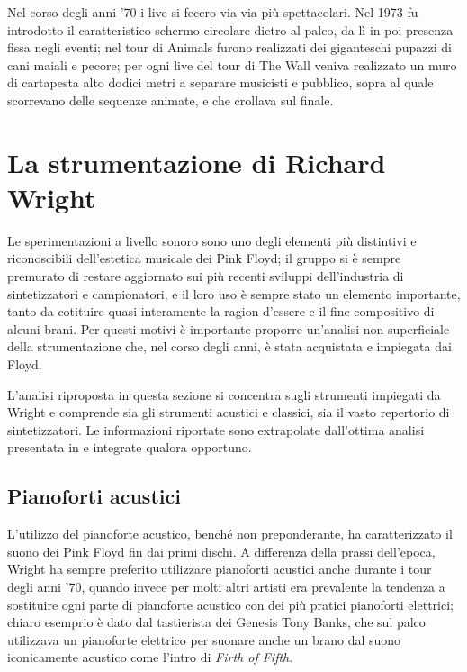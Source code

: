 \documentclass[class=book, crop=false, oneside, 12pt]{standalone}
\begin{document}
    Nel corso degli anni '70 i live si fecero via via più spettacolari. Nel 1973 fu introdotto il caratteristico schermo circolare dietro al palco, da lì in poi presenza fissa negli eventi; nel tour di Animals furono realizzati dei giganteschi pupazzi di cani maiali e pecore; per ogni live del tour di The Wall veniva realizzato un muro di cartapesta alto dodici metri a separare musicisti e pubblico, sopra al quale scorrevano delle sequenze animate, e che crollava sul finale.



    \section{La strumentazione di Richard Wright}\label{sec:01-gear}
    Le sperimentazioni a livello sonoro sono uno degli elementi più distintivi e riconoscibili dell'estetica musicale dei Pink Floyd; il gruppo si è sempre premurato di restare aggiornato sui più recenti sviluppi dell'industria di sintetizzatori e campionatori, e il loro uso è sempre stato un elemento importante, tanto da cotituire quasi interamente la ragion d'essere e il fine compositivo di alcuni brani. Per questi motivi è importante proporre un'analisi non superficiale della strumentazione che, nel corso degli anni, è stata acquistata e impiegata dai Floyd.

    L'analisi riproposta in questa sezione si concentra sugli strumenti impiegati da Wright e comprende sia gli strumenti acustici e classici, sia il vasto repertorio di sintetizzatori. Le informazioni riportate sono extrapolate dall'ottima analisi presentata in \cite{azimuth2004gear} e integrate qualora opportuno.
    
    \subsection{Pianoforti acustici}
    L'utilizzo del pianoforte acustico, benché non preponderante, ha caratterizzato il suono dei Pink Floyd fin dai primi dischi. A differenza della prassi dell'epoca, Wright ha sempre preferito utilizzare pianoforti acustici anche durante i tour degli anni '70, quando invece per molti altri artisti era prevalente la tendenza a sostituire ogni parte di pianoforte acustico con dei più pratici pianoforti elettrici; chiaro esemprio è dato dal tastierista dei Genesis Tony Banks, che sul palco utilizzava un pianoforte elettrico per suonare anche un brano dal suono iconicamente acustico come l'intro di \emph{Firth of Fifth}. 
    
\end{document}
